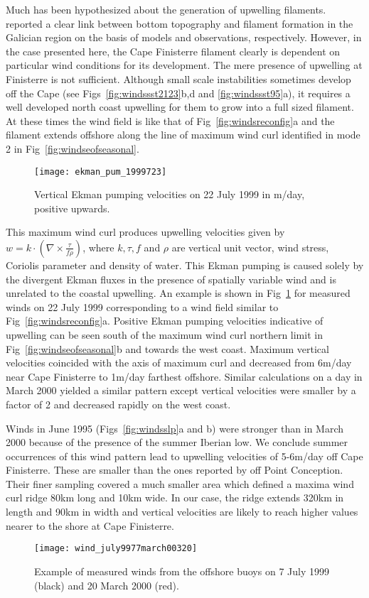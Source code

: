 Much has been hypothesized about the generation of upwelling
filaments.  \nocite{Roed99, Haynes93}  reported a clear
link between bottom topography and filament formation in the
Galician region on the basis of models and observations,
respectively. However, in the case presented here, the Cape
Finisterre filament clearly is dependent on particular wind
conditions for its development. The mere presence of upwelling at
Finisterre is not sufficient. Although small scale instabilities
sometimes develop off the Cape (see Figs~\ref{fig:windssst2123}b,d
and \ref{fig:windssst95}a), it requires a well developed north
coast upwelling for them to grow into a full sized filament. At
these times the wind field is like that of
Fig~\ref{fig:windsreconfig}a and the filament extends offshore
along the line of maximum wind curl identified in mode 2 in
Fig~\ref{fig:windseofseasonal}.
\begin{figure}
\texttt{[image: ekman\_pum\_1999723]}%
\caption{Vertical Ekman pumping velocities on 22 July 1999 in
m/day, positive upwards.} \label{fig:ekman}
\end{figure}

This maximum wind curl produces upwelling velocities given by
\(w=k\cdot(\nabla \times \frac{\tau}{f\rho} )\), where $k,\tau,f$
and $\rho$ are vertical unit vector, wind stress, Coriolis
parameter and density of water. This Ekman pumping is caused
solely by the divergent Ekman fluxes in the presence of spatially
variable wind and is unrelated to the coastal upwelling.  An
example is shown in Fig~\ref{fig:ekman} for measured winds on 22
July 1999 corresponding to a wind field similar to
Fig~\ref{fig:windsreconfig}a. Positive Ekman pumping velocities
indicative of upwelling can be seen south of the maximum wind curl
northern limit in Fig~\ref{fig:windseofseasonal}b and towards the
west coast. Maximum vertical velocities coincided with the axis of
maximum curl and decreased from 6m/day near Cape Finisterre to
1m/day farthest offshore. Similar calculations on a day in March
2000 yielded a similar pattern except vertical velocities were
smaller by a factor of 2 and decreased rapidly on the west coast.

Winds in June 1995 (Figs~\ref{fig:windsslp}a and b) were stronger
than in March 2000 because of the presence of the summer Iberian
low. We conclude summer occurrences of this wind pattern lead to
upwelling velocities of 5-6m/day off Cape Finisterre. These are
smaller than the ones reported by \nocite{munchow00} off Point Conception. Their finer sampling
covered a much smaller area which defined a maxima wind curl ridge
80km long and 10km wide. In our case, the ridge extends 320km in
length and 90km in width and vertical velocities are likely to
reach higher values nearer to the shore at Cape Finisterre.
\begin{figure}
\texttt{[image: wind\_july9977march00320]}
\caption{Example of measured winds from the offshore buoys on 7
July 1999 (black) and 20 March 2000 (red).} \label{fig:rev}
\end{figure}

